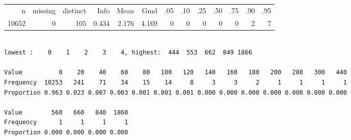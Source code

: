 \begin{spacing}{0.7}
{{{\smaller
\begin{tabular}{ rrrrrrrrrrrrr }
n&missing&distinct&Info&Mean&Gmd&.05&.10&.25&.50&.75&.90&.95 \\
10652&0&105&0.434&2.176&4.169&0&0&0&0&0&2&7 \end{tabular}
\begin{verbatim}

lowest :    0    1    2    3    4, highest:  444  553  662  849 1866
                                                                                              
Value          0    20    40    60    80   100   120   140   160   180   200   280   300   440
Frequency  10253   241    71    34    15    14     8     3     3     2     1     1     1     1
Proportion 0.963 0.023 0.007 0.003 0.001 0.001 0.001 0.000 0.000 0.000 0.000 0.000 0.000 0.000
                                  
Value        560   660   840  1860
Frequency      1     1     1     1
Proportion 0.000 0.000 0.000 0.000


\end{verbatim}}}}
\end{spacing}
